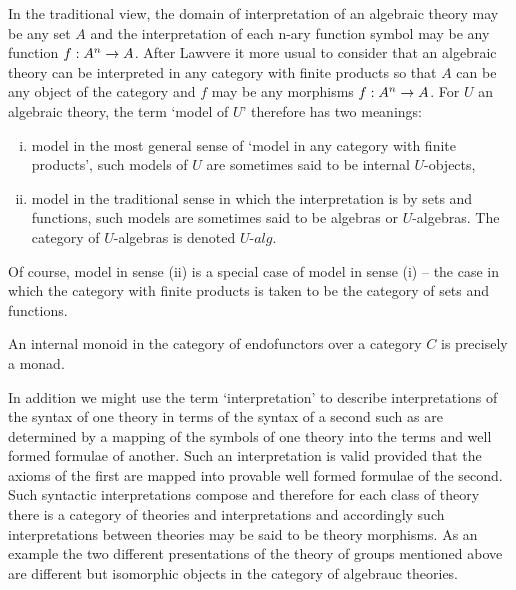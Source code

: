 \note
In the traditional view, the domain of interpretation of an algebraic theory may be any set $A$ 
and the interpretation of each n-ary function symbol may be any function $f:A^n \rightarrow A$.
After Lawvere it more usual to consider that an algebraic theory can be interpreted in any category with finite products
 so that $A$ can be any object of the category and  $f$ may be any morphisms $f:A^n \rightarrow A$. 
For $U$ an algebraic theory, the term `model of $U$' therefore has two meanings:
\begin{enumerate}[(i)]
\item model in the most general sense of `model in any category  with finite products',
 such models of $U$ are sometimes said to be internal $U$-objects,
\item model in the traditional sense in which the interpretation is by sets and functions, such models are sometimes said to be algebras or
$U$-algebras. The category of $U$-algebras is denoted $U$-$alg$. 
\end{enumerate} 
Of course, model in sense (ii) is a special case of model in sense (i) --  the case in which the category with finite products is taken to be the category of sets and functions.

\noindent An internal monoid in the category of endofunctors over a category $C$ is precisely a monad. 

\note In addition we might use the term `interpretation' to describe interpretations of the syntax of one theory in terms of the syntax of a second
such as are determined by a mapping of the symbols of one theory into the terms and well formed formulae of another. 
Such an interpretation is valid provided that the axioms of the first are mapped into provable well formed formulae of the second.  Such syntactic interpretations compose and therefore for each class of theory there is a category of theories and interpretations and accordingly such 
interpretations between theories may be said to be theory morphisms.
As an example the two different presentations of the theory of groups mentioned above are different but isomorphic objects in the category of algebrauc theories. 
